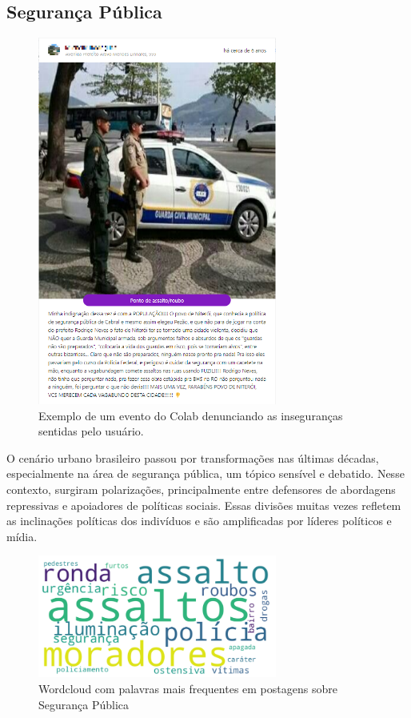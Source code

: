 \subsection{Segurança Pública}
\label{sec:eventos_populares_security}

\begin{figure}[htb]
	\centering
	\includegraphics[width=0.7\textwidth]{images/colab_posts_security.png}
	\caption{Exemplo de um evento do Colab denunciando as inseguranças sentidas pelo usuário.}
	\label{fig:colab_posts_security}
\end{figure}

O cenário urbano brasileiro passou por transformações nas últimas décadas, especialmente na área de segurança pública, um tópico sensível e debatido. Nesse contexto, surgiram polarizações, principalmente entre defensores de abordagens repressivas e apoiadores de políticas sociais. Essas divisões muitas vezes refletem as inclinações políticas dos indivíduos e são amplificadas por líderes políticos e mídia.

\begin{figure}[htb]
	\centering
	\includegraphics[width=0.7\textwidth]{images/wordcloud_security.png}
	\caption{Wordcloud com palavras mais frequentes em postagens sobre Segurança Pública}
	\label{fig:wordcloud_security}
\end{figure}

